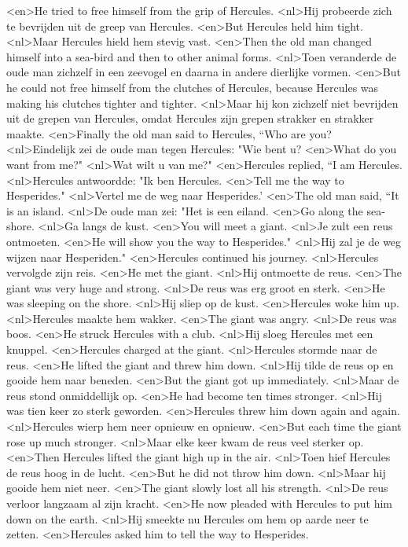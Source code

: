 <en>He tried to free himself from the grip of Hercules.
<nl>Hij probeerde zich te bevrijden uit de greep van Hercules.
<en>But Hercules held him tight.
<nl>Maar Hercules hield hem stevig vast.
<en>Then the old man changed himself into a sea-bird and then to other animal forms.
<nl>Toen veranderde de oude man zichzelf in een zeevogel en daarna in andere dierlijke vormen.
<en>But he could not free himself from the clutches of Hercules, because Hercules was making his clutches tighter and tighter.
<nl>Maar hij kon zichzelf niet bevrijden uit de grepen van Hercules, omdat Hercules zijn grepen strakker en strakker maakte.
<en>Finally the old man said to Hercules, “Who are you?
<nl>Eindelijk zei de oude man tegen Hercules: "Wie bent u?
<en>What do you want from me?"
<nl>Wat wilt u van me?"
<en>Hercules replied, “I am Hercules.
<nl>Hercules antwoordde: "Ik ben Hercules.
<en>Tell me the way to Hesperides."
<nl>Vertel me de weg naar Hesperides.'
<en>The old man said, “It is an island.
<nl>De oude man zei: "Het is een eiland.
<en>Go along the sea-shore.
<nl>Ga langs de kust.
<en>You will meet a giant.
<nl>Je zult een reus ontmoeten.
<en>He will show you the way to Hesperides."
<nl>Hij zal je de weg wijzen naar Hesperiden."
<en>Hercules continued his journey.
<nl>Hercules vervolgde zijn reis.
<en>He met the giant.
<nl>Hij ontmoette de reus.
<en>The giant was very huge and strong.
<nl>De reus was erg groot en sterk.
<en>He was sleeping on the shore.
<nl>Hij sliep op de kust.
<en>Hercules woke him up.
<nl>Hercules maakte hem wakker.
<en>The giant was angry.
<nl>De reus was boos.
<en>He struck Hercules with a club.
<nl>Hij sloeg Hercules met een knuppel.
<en>Hercules charged at the giant.
<nl>Hercules stormde naar de reus.
<en>He lifted the giant and threw him down.
<nl>Hij tilde de reus op en gooide hem naar beneden.
<en>But the giant got up immediately.
<nl>Maar de reus stond onmiddellijk op.
<en>He had become ten times stronger.
<nl>Hij was tien keer zo sterk geworden.
<en>Hercules threw him down again and again.
<nl>Hercules wierp hem neer opnieuw en opnieuw.
<en>But each time the giant rose up much stronger.
<nl>Maar elke keer kwam de reus veel sterker op.
<en>Then Hercules lifted the giant high up in the air.
<nl>Toen hief Hercules de reus hoog in de lucht.
<en>But he did not throw him down.
<nl>Maar hij gooide hem niet neer.
<en>The giant slowly lost all his strength.
<nl>De reus verloor langzaam al zijn kracht.
<en>He now pleaded with Hercules to put him down on the earth.
<nl>Hij smeekte nu Hercules om hem op aarde neer te zetten.
<en>Hercules asked him to tell the way to Hesperides.
